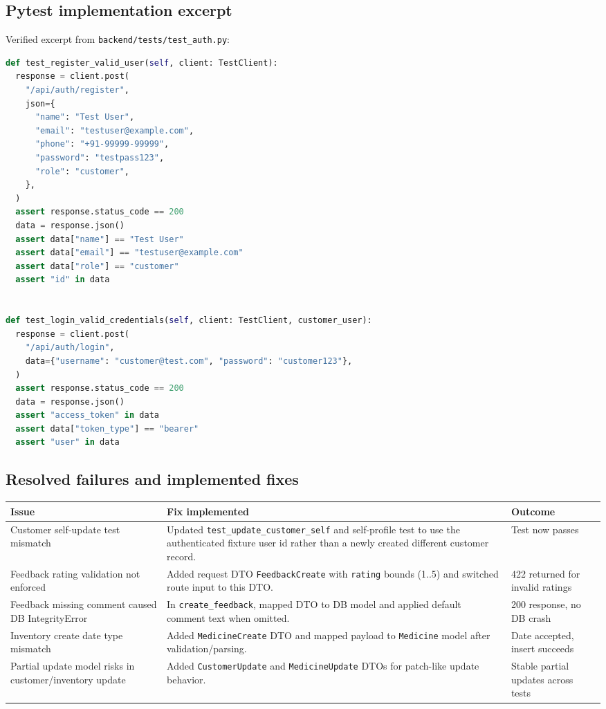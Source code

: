 \documentclass[11pt,a4paper]{article}
\newcommand{\apipath}[1]{\texttt{#1}}
\begin{document}
\subsection{Pytest implementation excerpt}
Verified excerpt from \apipath{backend/tests/test_auth.py}:

\begin{lstlisting}[language=Python]
def test_register_valid_user(self, client: TestClient):
  response = client.post(
    "/api/auth/register",
    json={
      "name": "Test User",
      "email": "testuser@example.com",
      "phone": "+91-99999-99999",
      "password": "testpass123",
      "role": "customer",
    },
  )
  assert response.status_code == 200
  data = response.json()
  assert data["name"] == "Test User"
  assert data["email"] == "testuser@example.com"
  assert data["role"] == "customer"
  assert "id" in data


def test_login_valid_credentials(self, client: TestClient, customer_user):
  response = client.post(
    "/api/auth/login",
    data={"username": "customer@test.com", "password": "customer123"},
  )
  assert response.status_code == 200
  data = response.json()
  assert "access_token" in data
  assert data["token_type"] == "bearer"
  assert "user" in data
\end{lstlisting}

\subsection{Resolved failures and implemented fixes}
\begin{longtable}{p{}p{}p{}}
\toprule
\textbf{Issue} & \textbf{Fix implemented} & \textbf{Outcome} \\
\midrule
Customer self-update test mismatch & Updated \apipath{test_update_customer_self} and self-profile test to use the authenticated fixture user id rather than a newly created different customer record. & Test now passes \\
Feedback rating validation not enforced & Added request DTO \apipath{FeedbackCreate} with \apipath{rating} bounds (1..5) and switched route input to this DTO. & 422 returned for invalid ratings \\
Feedback missing comment caused DB IntegrityError & In \apipath{create_feedback}, mapped DTO to DB model and applied default comment text when omitted. & 200 response, no DB crash \\
Inventory create date type mismatch & Added \apipath{MedicineCreate} DTO and mapped payload to \apipath{Medicine} model after validation/parsing. & Date accepted, insert succeeds \\
Partial update model risks in customer/inventory update & Added \apipath{CustomerUpdate} and \apipath{MedicineUpdate} DTOs for patch-like update behavior. & Stable partial updates across tests \\
\bottomrule
\end{longtable}
\end{document}

